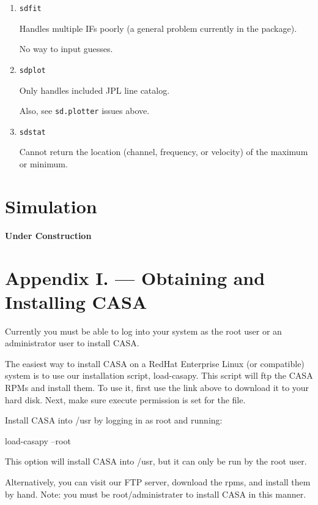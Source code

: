 \begin{enumerate}
\item {\tt sdfit}

  Handles multiple IFs poorly (a general problem currently in the package).

  No way to input guesses.

\item {\tt sdplot}

  Only handles included JPL line catalog.

  Also, see {\tt sd.plotter} issues above.

\item {\tt sdstat}

  Cannot return the location (channel, frequency, or velocity) of the
  maximum or minimum.

\end{enumerate}

\chapter{Simulation}

{\bf Under Construction}


\chapter{Appendix I. --- Obtaining and Installing CASA}
\label{chapter:app.1}

\vspace{3mm}

Currently you must be able to log into your system as the root user or
an administrator user to install CASA. 

The easiest way to install CASA on a RedHat Enterprise Linux (or
compatible) system is to use our installation script,
load-casapy. This script will ftp the CASA RPMs and install them. To
use it, first use the link above to download it to your hard
disk. Next, make sure execute permission is set for the file. 

Install CASA into /usr by logging in as root and running:

load-casapy --root

This option will install CASA into /usr, but it can only be run by the root user.

Alternatively, you can visit our FTP server, download the rpms, and
install them by hand. Note: you must be root/administrater to install
CASA in this manner. 

